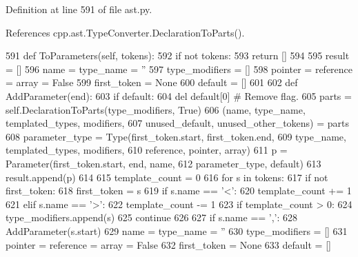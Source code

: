 Definition at line 591 of file ast.\+py.



References cpp.\+ast.\+Type\+Converter.\+Declaration\+To\+Parts().


\begin{DoxyCode}
591     \textcolor{keyword}{def }ToParameters(self, tokens):
592         \textcolor{keywordflow}{if} \textcolor{keywordflow}{not} tokens:
593             \textcolor{keywordflow}{return} []
594 
595         result = []
596         name = type\_name = \textcolor{stringliteral}{''}
597         type\_modifiers = []
598         pointer = reference = array = \textcolor{keyword}{False}
599         first\_token = \textcolor{keywordtype}{None}
600         default = []
601 
602         \textcolor{keyword}{def }AddParameter(end):
603             \textcolor{keywordflow}{if} default:
604                 del default[0]  \textcolor{comment}{# Remove flag.}
605             parts = self.DeclarationToParts(type\_modifiers, \textcolor{keyword}{True})
606             (name, type\_name, templated\_types, modifiers,
607              unused\_default, unused\_other\_tokens) = parts
608             parameter\_type = Type(first\_token.start, first\_token.end,
609                                   type\_name, templated\_types, modifiers,
610                                   reference, pointer, array)
611             p = Parameter(first\_token.start, end, name,
612                           parameter\_type, default)
613             result.append(p)
614 
615         template\_count = 0
616         \textcolor{keywordflow}{for} s \textcolor{keywordflow}{in} tokens:
617             \textcolor{keywordflow}{if} \textcolor{keywordflow}{not} first\_token:
618                 first\_token = s
619             \textcolor{keywordflow}{if} s.name == \textcolor{stringliteral}{'<'}:
620                 template\_count += 1
621             \textcolor{keywordflow}{elif} s.name == \textcolor{stringliteral}{'>'}:
622                 template\_count -= 1
623             \textcolor{keywordflow}{if} template\_count > 0:
624                 type\_modifiers.append(s)
625                 \textcolor{keywordflow}{continue}
626 
627             \textcolor{keywordflow}{if} s.name == \textcolor{stringliteral}{','}:
628                 AddParameter(s.start)
629                 name = type\_name = \textcolor{stringliteral}{''}
630                 type\_modifiers = []
631                 pointer = reference = array = \textcolor{keyword}{False}
632                 first\_token = \textcolor{keywordtype}{None}
633                 default = []

\end{DoxyCode}
